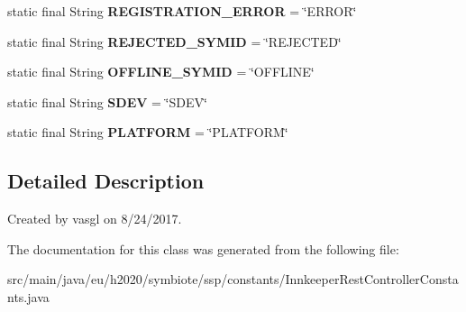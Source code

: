 \begin{DoxyCompactItemize}
\item 
\mbox{\label{classeu_1_1h2020_1_1symbiote_1_1ssp_1_1constants_1_1InnkeeperRestControllerConstants_acc1ed5f45ce93db235b4daf2399c9120}} 
static final String {\bfseries R\+E\+G\+I\+S\+T\+R\+A\+T\+I\+O\+N\+\_\+\+E\+R\+R\+OR} = \char`\"{}E\+R\+R\+OR\char`\"{}
\item 
\mbox{\label{classeu_1_1h2020_1_1symbiote_1_1ssp_1_1constants_1_1InnkeeperRestControllerConstants_a1c3199c95c2e4ccfbb477d114020a3b9}} 
static final String {\bfseries R\+E\+J\+E\+C\+T\+E\+D\+\_\+\+S\+Y\+M\+ID} = \char`\"{}R\+E\+J\+E\+C\+T\+ED\char`\"{}
\item 
\mbox{\label{classeu_1_1h2020_1_1symbiote_1_1ssp_1_1constants_1_1InnkeeperRestControllerConstants_a41a72c3c6a7e1935de62513cb3cf9e5b}} 
static final String {\bfseries O\+F\+F\+L\+I\+N\+E\+\_\+\+S\+Y\+M\+ID} = \char`\"{}O\+F\+F\+L\+I\+NE\char`\"{}
\item 
\mbox{\label{classeu_1_1h2020_1_1symbiote_1_1ssp_1_1constants_1_1InnkeeperRestControllerConstants_acf2d79c96865b97c3a81055fa6d7d4b2}} 
static final String {\bfseries S\+D\+EV} = \char`\"{}S\+D\+EV\char`\"{}
\item 
\mbox{\label{classeu_1_1h2020_1_1symbiote_1_1ssp_1_1constants_1_1InnkeeperRestControllerConstants_a9cdd31fa09dbd3d9a950245de4e7f9b7}} 
static final String {\bfseries P\+L\+A\+T\+F\+O\+RM} = \char`\"{}P\+L\+A\+T\+F\+O\+RM\char`\"{}
\end{DoxyCompactItemize}


\subsection{Detailed Description}
Created by vasgl on 8/24/2017. 

The documentation for this class was generated from the following file\+:\begin{DoxyCompactItemize}
\item 
src/main/java/eu/h2020/symbiote/ssp/constants/Innkeeper\+Rest\+Controller\+Constants.\+java\end{DoxyCompactItemize}
